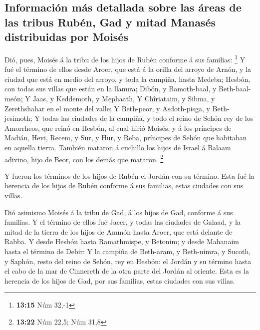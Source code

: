 \hypertarget{informaciuxf3n-muxe1s-detallada-sobre-las-uxe1reas-de-las-tribus-rubuxe9n-gad-y-mitad-manasuxe9s-distribuidas-por-moisuxe9s}{%
\subsection{Información más detallada sobre las áreas de las tribus
Rubén, Gad y mitad Manasés distribuidas por
Moisés}\label{informaciuxf3n-muxe1s-detallada-sobre-las-uxe1reas-de-las-tribus-rubuxe9n-gad-y-mitad-manasuxe9s-distribuidas-por-moisuxe9s}}

 Dió, pues, Moisés á la tribu de los hijos de Rubén
conforme á sus familias: \footnote{\textbf{13:15} Núm 32,-1}
 Y fué el término de ellos desde Aroer, que está á la
orilla del arroyo de Arnón, y la ciudad que está en medio del arroyo, y
toda la campiña, hasta Medeba;  Hesbón, con todas sus
villas que están en la llanura; Dibón, y Bamoth-baal, y Beth-baal-meón;
 Y Jaas, y Keddemoth, y Mephaath,  Y
Chîriataim, y Sibma, y Zerethshahar en el monte del valle;
 Y Beth-peor, y Asdoth-pisga, y Beth-jesimoth;
 Y todas las ciudades de la campiña, y todo el reino de
Sehón rey de los Amorrheos, que reinó en Hesbón, al cual hirió Moisés, y
á los príncipes de Madián, Hevi, Recem, y Sur, y Hur, y Reba, príncipes
de Sehón que habitaban en aquella tierra.  También
mataron á cuchillo los hijos de Israel á Balaam adivino, hijo de Beor,
con los demás que mataron. \footnote{\textbf{13:22} Núm 22,5; Núm 31,8}

 Y fueron los términos de los hijos de Rubén el Jordán
con su término. Esta fué la herencia de los hijos de Rubén conforme á
sus familias, estas ciudades con sus villas.

 Dió asimismo Moisés á la tribu de Gad, á los hijos de
Gad, conforme á sus familias.  Y el término de ellos fué
Jacer, y todas las ciudades de Galaad, y la mitad de la tierra de los
hijos de Ammón hasta Aroer, que está delante de Rabba.  Y
desde Hesbón hasta Ramathmispe, y Betonim; y desde Mahanaim hasta el
término de Debir:  Y la campiña de Beth-aram, y
Beth-nimra, y Sucoth, y Saphón, resto del reino de Sehón, rey en Hesbón:
el Jordán y su término hasta el cabo de la mar de Cinnereth de la otra
parte del Jordán al oriente.  Esta es la herencia de los
hijos de Gad, por sus familias, estas ciudades con sus villas.


